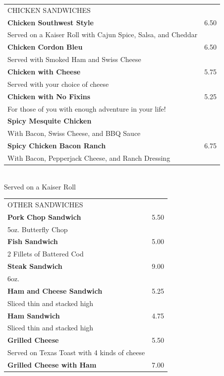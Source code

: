 \documentclass[10pt,notitlepage]{article}
\makeatletter
\newcommand*\ColText[1]{\uppercase{#1}}
\newenvironment{Group}[1]
	{\noindent\begin{tabular*}{\textwidth}{@{}p{.8\linewidth}@{\extracolsep{\fill}}r@{}}
		{\fontsize{16}{20}\selectfont\ColText{#1}}\\[0.8em]}
	{\end{tabular*}}
\newcommand*\Item[2]{%
	\sffamily\textbf{#1}\dotfill & #2}
\newcommand*\Desc[1]{%
	\sffamily\hspace*{1em}\footnotesize #1}
\makeatother
\begin{document}
	\vfill{}
	
	\begin{Group}{Chicken Sandwiches}
		\Item{Chicken Southwest Style}{6.50} \\
		\Desc{Served on a Kaiser Roll with Cajun Spice, Salsa, and Cheddar} \\
		\Item{Chicken Cordon Bleu}{6.50} \\
		\Desc{Served with Smoked Ham and Swiss Cheese} \\
		\Item{Chicken with Cheese}{5.75} \\
		\Desc{Served with your choice of cheese} \\
		\Item{Chicken with No Fixins}{5.25} \\
		\Desc{For those of you with enough adventure in your life!} \\
		\Item{Spicy Mesquite Chicken} \\
		\Desc{With Bacon, Swiss Cheese, and BBQ Sauce} \\
		\Item{Spicy Chicken Bacon Ranch}{6.75} \\
		\Desc{With Bacon, Pepperjack Cheese, and Ranch Dressing} \\
	\end{Group}
	\\[\baselineskip]
	\centering Served on a Kaiser Roll \\
	
	\vfill{}
	
	\begin{Group}{Other Sandwiches}
		\Item{Pork Chop Sandwich}{5.50} \\
		\Desc{5oz. Butterfly Chop} \\
		\Item{Fish Sandwich}{5.00} \\
		\Desc{2 Fillets of Battered Cod} \\
		\Item{Steak Sandwich}{9.00} \\
		\Desc{6oz.} \\
		\Item{Ham and Cheese Sandwich}{5.25} \\
		\Desc{Sliced thin and stacked high} \\
		\Item{Ham Sandwich}{4.75} \\
		\Desc{Sliced thin and stacked high} \\
		\Item{Grilled Cheese}{5.50} \\
		\Desc{Served on Texas Toast with 4 kinds of cheese} \\
		\Item{Grilled Cheese with Ham}{7.00} \\
	\end{Group}
	
\end{document}
